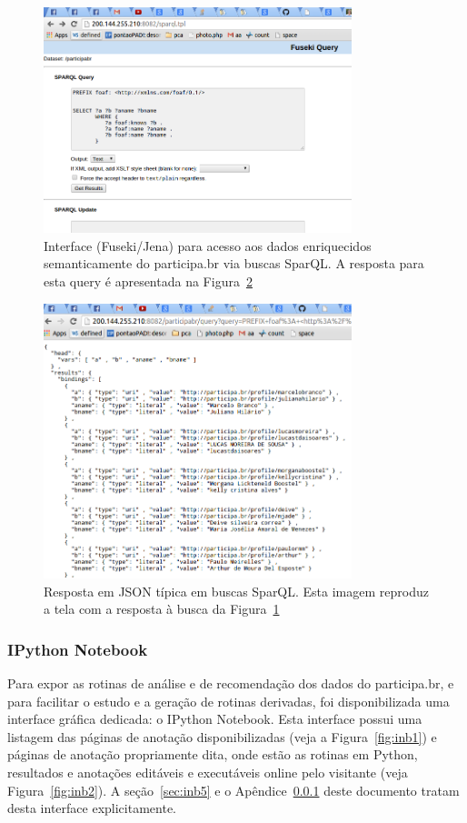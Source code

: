 \documentclass[12pt]{article}
\begin{document}
\begin{figure}[h!]
  \centering
      \includegraphics[width=0.8\textwidth]{screenshots/sparql}
  \caption{Interface (Fuseki/Jena) para acesso aos dados enriquecidos semanticamente do participa.br via buscas SparQL. A resposta para esta query é apresentada na Figura~\ref{fig:sparqlResp}}\label{fig:sparql}
\end{figure}


\begin{figure}[h!]
  \centering
      \includegraphics[width=0.8\textwidth]{screenshots/sparqlResp}
  \caption{Resposta em JSON típica em buscas SparQL. Esta imagem reproduz a tela com a resposta à busca da Figura~\ref{fig:sparql}}\label{fig:sparqlResp}
\end{figure}

\subsubsection{IPython Notebook}\label{sec:inb}
Para expor as rotinas de análise e de recomendação dos dados do participa.br, e para facilitar o estudo e a geração de rotinas derivadas, foi disponibilizada uma interface gráfica dedicada: o IPython Notebook. Esta interface possui uma listagem das páginas de anotação disponibilizadas (veja a Figura~\ref{fig:inb1}) e páginas de anotação propriamente dita, onde estão as rotinas em Python, resultados e anotações editáveis e executáveis online pelo visitante (veja Figura~\ref{fig:inb2}). A seção~\ref{sec:inb5} e o Apêndice~\ref{sec:inb} deste documento tratam desta interface explicitamente.
\end{document}
